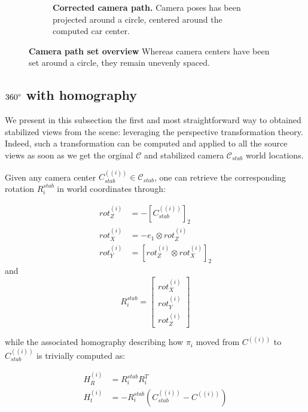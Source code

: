 \begin{figure}[htb!]
\begin{subfigure}[b]{0.45\linewidth}
    \caption{\textbf{Corrected camera path.} Camera poses has been projected around a circle, centered around the computed car center.}
    \label{fig:gs-camera-path-stab}
  \end{subfigure}
  \caption{\textbf{Camera path set overview} Whereas camera centers have been set around a circle, they remain unevenly spaced.}
  \label{fig:gs-campath}
\end{figure}

\subsection{$360\degree$ with homography}

We present in this subsection the first and most straightforward way to obtained stabilized views from the scene: leveraging the perspective transformation theory. Indeed, such a transformation can be computed and applied to all the source views as soon as we get the orginal $\mathcal{C}$ and stabilized camera $\mathcal{C}_{stab}$ world locations. 

Given any camera center $C^{((i))}_{stab} \in \mathcal{C}_{stab}$, one can retrieve the corresponding rotation $R_{i}^{stab}$ in world coordinates through: 

\begin{equation}
  \begin{split}
    rot^{(i)}_{Z} & = - {\left[C^{((i))}_{stab}\right]}_{2}\\
    rot^{(i)}_{X} & = - e_{1} \otimes rot^{(i)}_{Z} \\
    rot^{(i)}_{Y} & = {\left[rot^{(i)}_{Z}\otimes rot^{(i)}_{X}\right]}_{2}
    \end{split}
\end{equation}
and 
\begin{equation}
R_{i}^{stab}  = \begin{bmatrix}
      rot^{(i)}_{X}\\
      rot^{(i)}_{Y} \\
      rot^{(i)}_{Z}
      \end{bmatrix}
\end{equation}

while the associated homography describing how $\pi_{i}$ moved from $C^{((i))}$ to $C^{((i))}_{stab}$ is trivially computed as: 

\begin{equation}
  \begin{split}
    H_{R}^{(i)} & = R_{i}^{stab}R_{i}^{T} \\
    H_{t}^{(i)} & = - R_{i}^{stab}(C^{((i))}_{stab} - C^{((i))})
  \end{split}
\end{equation}


